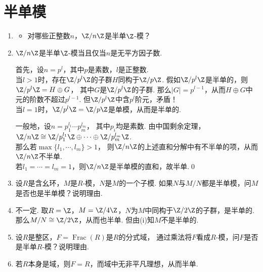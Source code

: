 \section{半单模}
    \begin{enumerate}
        \item[8.1] 
        \begin{itemize}
            \item[(i)] 对哪些正整数$n$，$\Z/n\Z$是半单$\Z$-模？
        \end{itemize}
        \item[\textbf{证明:}]
            $\Z/n\Z$是半单$\Z$-模当且仅当$n$是无平方因子数.

            首先，设$n = p^{l}$，其中$p$是素数，$l$是正整数.\\
            当$l > 1$时，存在$\Z/p^{l}\Z$的子群$H$同构于$\Z/p\Z$.
            假如$\Z/p^{l}\Z$是半单的，则$\Z/p^{l}\Z = H \oplus G$，
            其中$G$是$\Z/p^{l}\Z$的子群.
            那么$|G|=p^{l-1}$，从而$H \oplus G$中元的阶数不超过$p^{l-1}$.
            但$\Z/p^{l}\Z$中含$p^{l}$阶元，矛盾！\\
            当$l=1$时，$\Z/p^{l}\Z = \Z/p\Z$是单模，从而是半单的.

            一般地，设$n = p_{1}^{l_{1}} \cdots p_{m}^{l_{m}}$，
            其中$p_{i}$均是素数.
            由中国剩余定理，$\Z/n\Z \cong 
            \Z/p_{1}^{l_{1}}\Z \oplus \cdots \oplus \Z/p_{m}^{l_{m}}\Z$.\\
            那么若$\max\{l_{1},\cdots,l_{m}\}>1$，
            则$\Z/n\Z$的上述直和分解中有不半单的项，从而$\Z/n\Z$不半单. \\
            若$l_{1} = \cdots = l_{m} = 1$，则$\Z/n\Z$是半单模的直和，故半单.\qed

        \item[(ii)] 设$R$是含幺环，$M$是$R$-模，$N$是$M$的一个子模.
            如果$N$与$M/N$都是半单模，问$M$是否也是半单模？说明理由.
        \item[\textbf{证明:}]
            不一定. 取$R = \Z$，$M = \Z/4\Z$，$N$为$M$中同构于$\Z/2\Z$的子群，是半单的.
            那么$M/N \cong \Z/2\Z$，从而也半单.
            但由(i)知$M$不是半单的.

        \item[(iii)] 设$R$是整区，$F = \operatorname{Frac}(R)$是$R$的分式域，
            通过乘法将$F$看成$R$-模，问$F$是否是半单$R$-模？说明理由.
        \item[\textbf{证明:}]
            若$R$本身是域，则$F = R$，而域中无非平凡理想，从而半单.


\end{enumerate}
